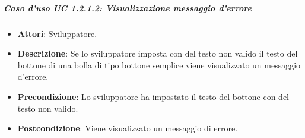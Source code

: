 \subparagraph{Caso d'uso UC 1.2.1.2: Visualizzazione messaggio d'errore}

\FloatBarrier
\begin{itemize}
\item\textbf{Attori}: Sviluppatore.
\item\textbf{Descrizione}: Se lo sviluppatore imposta con del testo non valido il testo del bottone di una bolla di tipo bottone semplice viene visualizzato un messaggio d'errore.
\item\textbf{Precondizione}: Lo sviluppatore ha impostato il testo del bottone con del testo non valido.
\item\textbf{Postcondizione}: Viene visualizzato un messaggio di errore.
\end{itemize}
